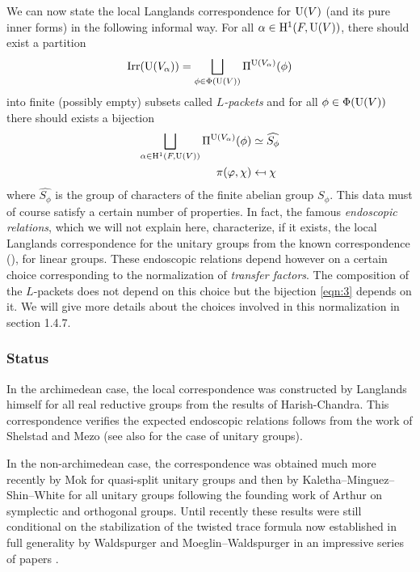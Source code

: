 We can now state the local Langlands correspondence for $\mathrm{U}(V)$ (and its pure inner forms) in the following informal way.
For all $\alpha \in \mathrm{H}^1(F, \mathrm{U}(V))$, there should exist a partition
\[
    \mathrm{Irr}(\mathrm{U}(V_\alpha)) = \bigsqcup_{\phi \in \Phi(\mathrm{U}(V))} \Pi^{\mathrm{U}(V_\alpha)}(\phi) 
\]
into finite (possibly empty) subsets called \emph{$L$-packets} and for all $\phi \in \Phi(\mathrm{U}(V))$ there should exists a bijection
\begin{equation}
\label{eqn:3}
\begin{aligned}
    \bigsqcup_{\alpha \in \mathrm{H}^{1}(F, \mathrm{U}(V))} \Pi^{\mathrm{U}(V_\alpha)}(\phi) &\simeq \widehat{S_\phi} \\
    \pi(\varphi, \chi) &\mapsfrom \chi
\end{aligned}
\end{equation}
where $\widehat{S_\phi}$ is the group of characters of the finite abelian group $S_\phi$.
This data must of course satisfy a certain number of properties.
In fact, the famous \emph{endoscopic relations}, which we will not explain here, characterize, if it exists, the local Langlands correspondence for the unitary groups from the known correspondence (\cite{harris2001geometry,henniart2000preuve,scholze2013local}), for linear groups.
These endoscopic relations depend however on a certain choice corresponding to the normalization of \emph{transfer factors}.
The composition of the $L$-packets does not depend on this choice but the bijection \eqref{eqn:3} depends on it.
We will give more details about the choices involved in this normalization in section 1.4.7.


\subsubsection{Status}

In the archimedean case, the local correspondence was constructed by Langlands himself \cite{langlands1989irreducible} for all real reductive groups from the results of Harish-Chandra.
This correspondence verifies the expected endoscopic relations follows from  the work of Shelstad \cite{shelstad1982indistinguishability,shelstad2008tempered,shelstad2010tempered} and Mezo \cite{mezo2016tempered} (see also \cite{clozel1982changement} for the case of unitary groups).

In the non-archimedean case, the correspondence was obtained much more recently by Mok \cite{mok2015endoscopic} for quasi-split unitary groups and then by Kaletha--Minguez--Shin--White \cite{kaletha2014endoscopic} for all unitary groups following the founding work of Arthur \cite{arthur2013endoscopic} on symplectic and orthogonal groups.
Until recently these results were still conditional on the stabilization of the twisted trace formula now established in full generality by Waldspurger and Moeglin--Waldspurger in an impressive series of papers \cite{moeglin2016stabilisation}.


